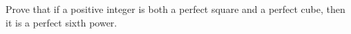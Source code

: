 Prove that if a positive integer is both a perfect square and a perfect cube, then it is a perfect sixth power.
